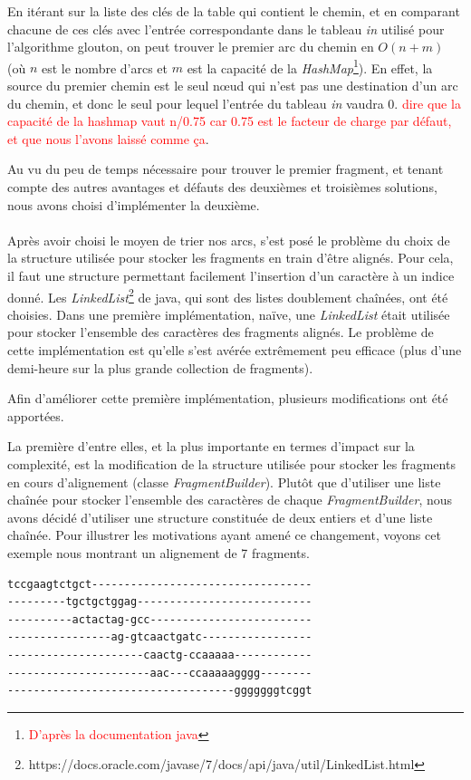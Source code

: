 \documentclass{article}
\begin{document}
En itérant sur la liste des clés de la table qui contient le chemin, et en comparant chacune de ces clés avec l'entrée correspondante dans le tableau \textit{in} utilisé pour l'algorithme glouton, on peut trouver le premier arc du chemin en $O(n+m)$ (où $n$ est le nombre d'arcs et $m$ est la capacité de la \textit{HashMap}\footnote{\textcolor{red}{D'après la documentation java}}). En effet, la source du premier chemin est le seul nœud qui n'est pas une destination d'un arc du chemin, et donc le seul pour lequel l'entrée du tableau \textit{in} vaudra $0$. \textcolor{red}{dire que la capacité de la hashmap vaut n/0.75 car 0.75 est le facteur de charge par défaut, et que nous l'avons laissé comme ça}.

Au vu du peu de temps nécessaire pour trouver le premier fragment, et tenant compte des autres avantages et défauts des deuxièmes et troisièmes solutions, nous avons choisi d'implémenter la deuxième.
\\~\\ 
 
Après avoir choisi le moyen de trier nos arcs, s'est posé le problème du choix de la structure utilisée pour stocker les fragments en train d'être alignés. Pour cela, il faut une structure permettant facilement l'insertion d'un caractère à un indice donné. Les \textit{LinkedList}\footnote{https://docs.oracle.com/javase/7/docs/api/java/util/LinkedList.html} de java, qui sont des listes doublement chaînées, ont été choisies. Dans une première implémentation, naïve, une \textit{LinkedList} était utilisée pour stocker l'ensemble des caractères des fragments alignés. 
Le problème de cette implémentation est qu'elle s'est avérée extrêmement peu efficace (plus d'une demi-heure sur la plus grande collection de fragments). 

Afin d'améliorer cette première implémentation, plusieurs modifications ont été apportées.

La première d'entre elles, et la plus importante en termes d'impact sur la complexité, est la modification de la structure utilisée pour stocker les fragments en cours d'alignement (classe \textit{FragmentBuilder}). Plutôt que d'utiliser une liste chaînée pour stocker l'ensemble des caractères de chaque \textit{FragmentBuilder}, nous avons décidé d'utiliser une structure constituée de deux entiers et d'une liste chaînée. Pour illustrer les motivations ayant amené ce changement, voyons cet exemple nous montrant un alignement de 7 fragments.

\begin{verbatim}
tccgaagtctgct----------------------------------
---------tgctgctggag---------------------------
----------actactag-gcc-------------------------
----------------ag-gtcaactgatc-----------------
---------------------caactg-ccaaaaa------------
----------------------aac---ccaaaaagggg--------
-----------------------------------gggggggtcggt
\end{verbatim}
\end{document}
